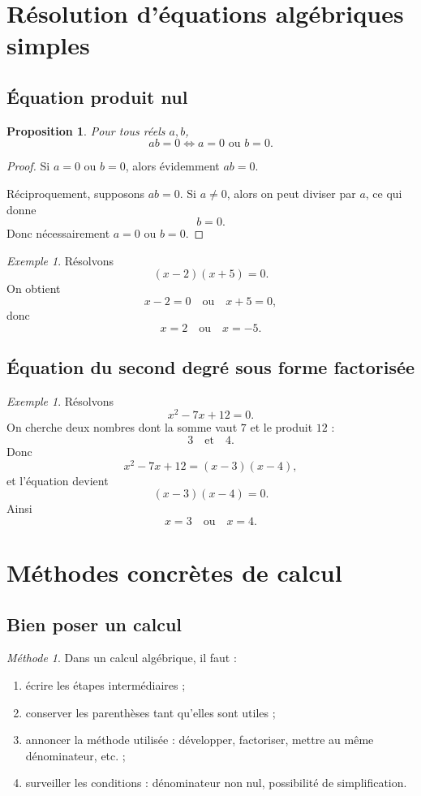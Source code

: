 \documentclass[11pt,a4paper]{article}
\newtheorem{proposition}[definition]{Proposition}
\theoremstyle{remark}
\newtheorem{exemple}[definition]{Exemple}
\newtheorem*{methode}{Méthode}
\begin{document}
\section{Résolution d’équations algébriques simples}

\subsection{Équation produit nul}

\begin{proposition}
Pour tous réels \(a,b\),
\[
ab=0 \Longleftrightarrow a=0 \text{ ou } b=0.
\]
\end{proposition}

\begin{proof}
Si \(a=0\) ou \(b=0\), alors évidemment \(ab=0\).

Réciproquement, supposons \(ab=0\). Si \(a\neq 0\), alors on peut diviser par \(a\), ce qui donne
\[
b=0.
\]
Donc nécessairement \(a=0\) ou \(b=0\).
\end{proof}

\begin{exemple}
Résolvons
\[
(x-2)(x+5)=0.
\]
On obtient
\[
x-2=0 \quad \text{ou} \quad x+5=0,
\]
donc
\[
x=2 \quad \text{ou} \quad x=-5.
\]
\end{exemple}

\subsection{Équation du second degré sous forme factorisée}

\begin{exemple}
Résolvons
\[
x^2-7x+12=0.
\]
On cherche deux nombres dont la somme vaut \(7\) et le produit \(12\) :
\[
3 \quad \text{et} \quad 4.
\]
Donc
\[
x^2-7x+12=(x-3)(x-4),
\]
et l’équation devient
\[
(x-3)(x-4)=0.
\]
Ainsi
\[
x=3 \quad \text{ou} \quad x=4.
\]
\end{exemple}

\section{Méthodes concrètes de calcul}

\subsection{Bien poser un calcul}

\begin{methode}
Dans un calcul algébrique, il faut :
\begin{enumerate}
    \item écrire les étapes intermédiaires ;
    \item conserver les parenthèses tant qu’elles sont utiles ;
    \item annoncer la méthode utilisée : développer, factoriser, mettre au même dénominateur, etc. ;
    \item surveiller les conditions : dénominateur non nul, possibilité de simplification.
\end{enumerate}
\end{methode}
\end{document}

